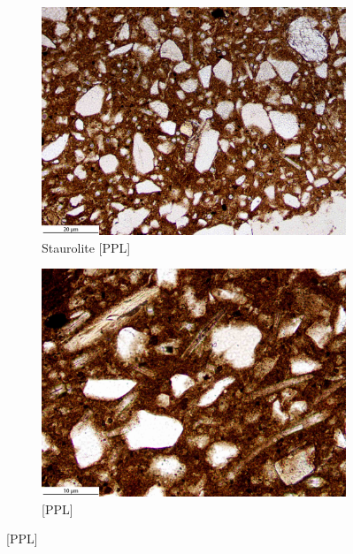 \documentclass[a4paper]{article}
\begin{document}
\begin{figure}[H]
	\begin{subfigure}[t]{.49\textwidth}
		\includegraphics[width=\textwidth]{ThinSections/52-3_10x_PPL.jpg}
		\caption{Staurolite [PPL]}
	\end{subfigure}\hspace{.5em}\hfill
	\begin{subfigure}[t]{.49\textwidth}
		\includegraphics[width=\textwidth]{ThinSections/52-2_20x_PPL.jpg}
		\caption{[PPL]}
	\end{subfigure}

\end{figure}
\end{document}
